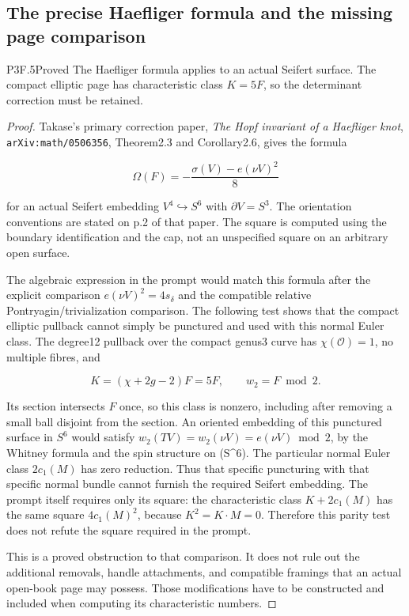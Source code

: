\subsection{The precise Haefliger formula and the missing page comparison}
\begin{statement}{P3F.5}{Proved}
The Haefliger formula applies to an actual Seifert surface. The compact elliptic page has characteristic class $K=5F$, so the determinant correction must be retained.
\end{statement}
\begin{proof}
Takase's primary correction paper, \emph{The Hopf invariant of a Haefliger knot}, \nolinkurl{arXiv:math/0506356}, Theorem2.3 and Corollary2.6, gives the formula

\[
 \Omega(F)=-\frac{\sigma(V)-e(\nu V)^2}{8} \tag{P3F.5.1}
\]

for an actual Seifert embedding \(V^4\hookrightarrow S^6\) with \(\partial V=S^3\). The orientation conventions are stated on p.2 of that paper. The square is computed using the boundary identification and the cap, not an unspecified square on an arbitrary open surface.

The algebraic expression in the prompt would match this formula after the explicit comparison \(e(\nu V)^2=4s_\delta\) and the compatible relative Pontryagin/trivialization comparison. The following test shows that the compact elliptic pullback cannot simply be punctured and used with this normal Euler class. The degree12 pullback over the compact genus3 curve has \(\chi(\mathcal O)=1\), no multiple fibres, and

\[
 K=(\chi+2g-2)F=5F,\qquad w_2=F\bmod2.
\]

Its section intersects \(F\) once, so this class is nonzero, including after removing a small ball disjoint from the section. An oriented embedding of this punctured surface in \(S^6\) would satisfy \(w_2(TV)=w_2(\nu V)=e(\nu V)\bmod2\), by the Whitney formula and the spin structure on (S\^{}6). The particular normal Euler class \(2c_1(M)\) has zero reduction. Thus that specific puncturing with that specific normal bundle cannot furnish the required Seifert embedding. The prompt itself requires only its square: the characteristic class \(K+2c_1(M)\) has the same square \(4c_1(M)^2\), because \(K^2=K\cdot M=0\). Therefore this parity test does not refute the square required in the prompt.

This is a proved obstruction to that comparison. It does not rule out the additional removals, handle attachments, and compatible framings that an actual open-book page may possess. Those modifications have to be constructed and included when computing its characteristic numbers.


\end{proof}
